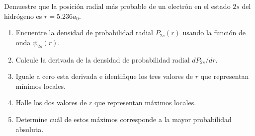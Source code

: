 \item Demuestre que la posición radial más probable de un electrón en el estado $2s$ del hidrógeno es $r = 5.236 a_0$.
\begin{enumerate}
    \item Encuentre la densidad de probabilidad radial $P_{2s}(r)$ usando la función de onda $\psi_{2s}(r)$.
    \item Calcule la derivada de la densidad de probabilidad radial $dP_{2s}/dr$.
    \item Iguale a cero esta derivada e identifique los tres valores de $r$ que representan mínimos locales.
    \item Halle los dos valores de $r$ que representan máximos locales.
    \item Determine cuál de estos máximos corresponde a la mayor probabilidad absoluta.
\end{enumerate}